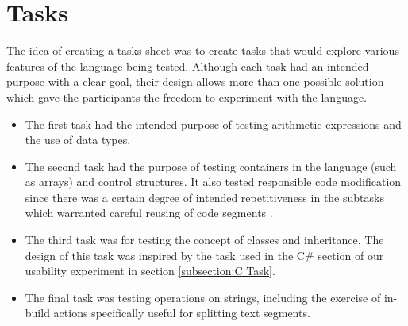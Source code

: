 \section{Tasks}
The idea of creating a tasks sheet was to create tasks that would explore various features of the language being tested. Although each task had an intended purpose with a clear goal, their design allows more than one possible solution which gave the participants the freedom to experiment with the language.
\begin{itemize}
\item The first task had the intended purpose of testing arithmetic expressions and the use of data types.
\item The second task had the purpose of testing containers in the language (such as arrays) and control structures.
It also tested responsible code modification since there was a certain degree of intended repetitiveness in the subtasks which warranted careful reusing of code segments .%
\item The third task was for testing the concept of classes and inheritance. The design of this task was inspired by the task used in the C\# section of our usability experiment in section \ref{subsection:C Task}.
\item The final task was testing operations on strings, including the exercise of in-build actions specifically useful for splitting text segments.
\end{itemize}

